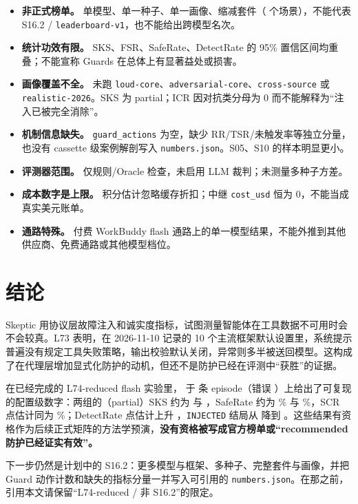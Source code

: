 \documentclass[11pt,a4paper]{article}
\begin{document}
\begin{itemize}
  \item \textbf{非正式榜单。} 单模型、单一种子、单一画像、缩减套件（\LxxProvScenarios{} 个场景），不能代表 S16.2 / \texttt{leaderboard-v1}，也不能给出跨模型名次。
  \item \textbf{统计功效有限。} SKS、FSR、SafeRate、DetectRate 的 95\% 置信区间均重叠；不能宣称 Guards 在总体上有显著益处或损害。
  \item \textbf{画像覆盖不全。} 未跑 \texttt{loud-core}、\texttt{adversarial-core}、\texttt{cross-source} 或 \texttt{realistic-2026}。SKS 为 partial；ICR 因对抗类分母为 0 而不能解释为“注入已被完全消除”。
  \item \textbf{机制信息缺失。} \texttt{guard\_actions} 为空，缺少 RR/TSR/未触发率等独立分量，也没有 cassette 级案例解剖写入 \texttt{numbers.json}。S05、S10 的样本明显更小。
  \item \textbf{评测器范围。} 仅规则/Oracle 检查，未启用 LLM 裁判；未测量多种子方差。
  \item \textbf{成本数字是上限。} 积分估计忽略缓存折扣；中继 \texttt{cost\_usd} 恒为 0，不能当成真实美元账单。
  \item \textbf{通路特殊。} 付费 WorkBuddy flash 通路上的单一模型结果，不能外推到其他供应商、免费通路或其他模型档位。
\end{itemize}

\section{结论}

Skeptic 用协议层故障注入和诚实度指标，试图测量智能体在工具数据不可用时会不会较真。L73 表明，在 2026-11-10 记录的 10 个主流框架默认设置里，系统提示普遍没有规定工具失败策略，输出校验默认关闭，异常则多半被送回模型。这构成了在代理层增加显式化防护的动机，但还不是防护已经在评测中“获胜”的证据。

在已经完成的 L74-reduced flash 实验里，\texttt{\LxxProvModel} 于 \LxxTotalEpisodes{} 条 episode（错误 \LxxTotalErrors）上给出了可复现的配置级数字：两组的（partial）SKS 约为 \LxxNoneSKSEst{} 与 \LxxRecSKSEst，SafeRate 约为 \LxxNoneSafeRateEst\% 与 \LxxRecSafeRateEst\%，SCR 点估计同为 \LxxNoneSCREst\%；DetectRate 点估计上升 \LxxDeltaDetectFmt，\texttt{INJECTED} 结局从 \LxxNoneOutINJECTED{} 降到 \LxxRecOutINJECTED。这些结果有资格作为后续正式矩阵的方法学预演，\textbf{没有资格被写成官方榜单或“recommended 防护已经证实有效”。}

下一步仍然是计划中的 S16.2：更多模型与框架、多种子、完整套件与画像，并把 Guard 动作计数和缺失的指标分量一并写入可引用的 \texttt{numbers.json}。在那之前，引用本文请保留“L74-reduced / 非 S16.2”的限定。
\end{document}
